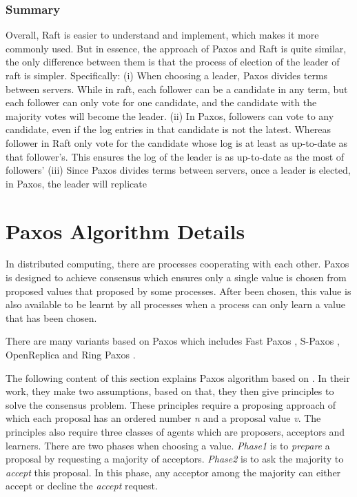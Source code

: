 \documentclass[12pt, a4paper]{article}
\begin{document}
\subsubsection{Summary}
Overall, Raft is easier to understand and implement, which makes it more commonly used. But in essence, the approach of Paxos and Raft is quite similar, the only difference between them is that the process of election of the leader of raft is simpler. Specifically: (i) When choosing a leader, Paxos divides terms between servers. While in raft, each follower can be a candidate in any term, but each follower can only vote for one candidate, and the candidate with the majority votes will become the leader. (ii) In Paxos, followers can vote to any candidate, even if the log entries in that candidate is not the latest. Whereas follower in Raft only vote for the candidate whose log is at least as up-to-date as that follower's. This ensures the log of the leader
is as up-to-date as the most of followers' (iii) Since Paxos divides terms between servers, once a leader is elected, in Paxos, the leader will replicate


\section{Paxos Algorithm Details} \label{sec:paxos}

In distributed computing, there are processes cooperating with each other.
Paxos is designed to achieve consensus which ensures
only a single value is chosen from proposed values that
proposed by some processes\cite{fischer1983consensus}.
After been chosen, this value is also available to be learnt by all processes
when a process can only learn a value that has been chosen.

There are many variants based on Paxos \cite{lamport2001paxos} which includes
Fast Paxos \cite{fastpaxos}, S-Paxos \cite{spaxos},  OpenReplica \cite{openreplica}
and Ring Paxos \cite{ringpaxos}.

The following content of this section explains
Paxos algorithm based on \cite{fischer1983consensus}.
In their work, they make two assumptions,
based on that, they then give principles to solve the consensus problem.
These principles require a proposing approach
of which each proposal has an ordered number \textit{n}
and a proposal value \textit{v}.
The principles also require three classes of agents
which are proposers, acceptors and learners.
There are two phases when choosing a value.
\textit{Phase1} is to \textit{prepare} a proposal
by requesting a majority of acceptors.
\textit{Phase2} is to ask the majority to \textit{accept} this proposal.
In this phase, any acceptor among the majority can
either accept or decline the \textit{accept} request.
\end{document}
